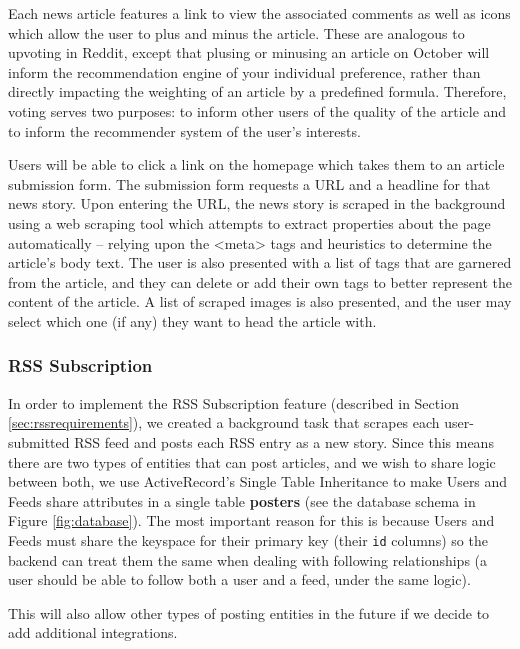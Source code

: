 \documentclass[11pt,letterpaper,titlepage]{article}
\begin{document}
Each news article features a link to view the associated comments as well as icons which allow the user to plus and minus the article.
These are analogous to upvoting in Reddit, except that plusing or minusing an article on October will inform the recommendation engine of your individual preference, rather than directly impacting the weighting of an article by a predefined formula.
Therefore, voting serves two purposes: to inform other users of the quality of the article and to inform the recommender system of the user's interests.

Users will be able to click a link on the homepage which takes them to an article submission form.
The submission form requests a URL and a headline for that news story.
Upon entering the URL, the news story is scraped in the background using a web scraping tool which attempts to extract properties about the page automatically -- relying upon the <meta> tags and heuristics to determine the article's body text. The user is also presented with a list of tags that are garnered from the article, and they can delete or add their own tags to better represent the content of the article. A list of scraped images is also presented, and the user may select which one (if any) they want to head the article with.

\subsubsection{RSS Subscription}
\label{sec:frontendrss}
In order to implement the RSS Subscription feature (described in Section \ref{sec:rssrequirements}), we created a background task that scrapes each user-submitted RSS feed and posts each RSS entry as a new story.
Since this means there are two types of entities that can post articles, and we wish to share logic between both, we use ActiveRecord's Single Table Inheritance\cite{sti} to make Users and Feeds share attributes in a single table \textbf{posters} (see the database schema in Figure \ref{fig:database}).
The most important reason for this is because Users and Feeds must share the keyspace for their primary key (their \verb+id+ columns) so the backend can treat them the same when dealing with following relationships (a user should be able to follow both a user and a feed, under the same logic).

This will also allow other types of posting entities in the future if we decide to add additional integrations.
\end{document}
